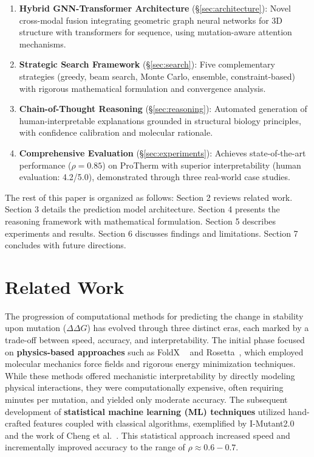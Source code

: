 \documentclass[11pt]{article}
\begin{document}
\begin{enumerate}
    \item \textbf{Hybrid GNN-Transformer Architecture}
        (\S\ref{sec:architecture}): Novel cross-modal fusion integrating
        geometric graph neural networks for 3D structure with transformers for
        sequence, using mutation-aware attention mechanisms.
    
    \item \textbf{Strategic Search Framework} (\S\ref{sec:search}): Five
        complementary strategies (greedy, beam search, Monte Carlo, ensemble,
        constraint-based) with rigorous mathematical formulation and
        convergence analysis.
    
    \item \textbf{Chain-of-Thought Reasoning} (\S\ref{sec:reasoning}):
        Automated generation of human-interpretable explanations grounded in
        structural biology principles, with confidence calibration and
        molecular rationale.
    
\item \textbf{Comprehensive Evaluation} (\S\ref{sec:experiments}): Achieves
state-of-the-art performance ($\rho = 0.85$) on ProTherm with superior
interpretability (human evaluation: 4.2/5.0), demonstrated through three
real-world case studies.  \end{enumerate}

The rest of this paper is organized as follows: Section 2 reviews related work.
Section 3 details the prediction model architecture. Section 4 presents the
reasoning framework with mathematical formulation. Section 5 describes
experiments and results. Section 6 discusses findings and limitations. Section
7 concludes with future directions.

\section{Related Work}


The progression of computational methods for predicting the change in stability
upon mutation ($\Delta\Delta G$) has evolved through three distinct eras, each
marked by a trade-off between speed, accuracy, and interpretability. The
initial phase focused on \textbf{physics-based approaches} such as FoldX
~\cite{schymkowitz2005foldx} and Rosetta~\cite{kellogg2011role}, which
employed molecular mechanics force fields and rigorous energy minimization
techniques. While these methods offered mechanistic interpretability by
directly modeling physical interactions, they were computationally expensive,
often requiring minutes per mutation, and yielded only moderate accuracy. The
subsequent development of \textbf{statistical machine learning (ML) techniques}
utilized hand-crafted features coupled with classical algorithms, exemplified
by I-Mutant2.0~\cite{capriotti2005mutant} and the work of Cheng 
et al.~\cite{cheng2006prediction}. This statistical approach increased speed and
incrementally improved accuracy to the range of $\rho \approx 0.6-0.7$.
\end{document}
